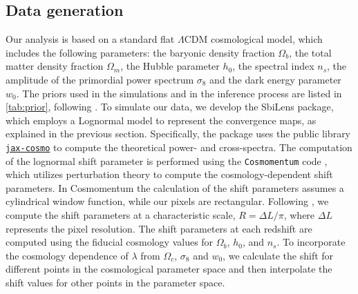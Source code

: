 \documentclass{aa}
\begin{document}
\subsection{Data generation}
Our analysis is based on a standard flat $\Lambda$CDM cosmological model,  which includes the following parameters: the baryonic density fraction $\Omega_b$, the total matter density fraction $\Omega_m$, the Hubble parameter $h_0$, the spectral index $n_s$, the amplitude of the primordial power spectrum $\sigma_8$ and the dark energy parameter $w_0$. The priors used in the simulations and in the inference process are listed in \autoref{tab:prior}, following \citet{zhang2022transitioning}.
To simulate our data, we develop the SbiLens package, which employs a Lognormal model to represent the convergence maps, as explained in the previous section. Specifically, the package uses the public library \href{https://github.com/DifferentiableUniverseInitiative/jax_cosmo}{\texttt{jax-cosmo}} \citep{Campagne_2023} to compute the theoretical power- and cross-spectra. The computation of the lognormal shift parameter is performed using the \texttt{Cosmomentum} code \citep{friedrich2018density, friedrich2020primordial}, which utilizes perturbation theory to compute the cosmology-dependent shift parameters. In Cosmomentum the calculation of the shift parameters assumes a cylindrical window function, while our pixels are rectangular. Following \citet{boruah2022map}, we compute the shift parameters at a characteristic scale, $R=\Delta L/\pi$, where $\Delta L$ represents the pixel resolution. The shift parameters at each redshift are computed using the fiducial cosmology values for $\Omega_b$, $h_0$, and $n_s$. To incorporate the cosmology dependence of $\lambda$ from $\Omega_c$, $\sigma_8$ and $w_0$, we calculate the shift for different points in the cosmological parameter space and then interpolate the shift values for other points in the parameter space.
\end{document}
